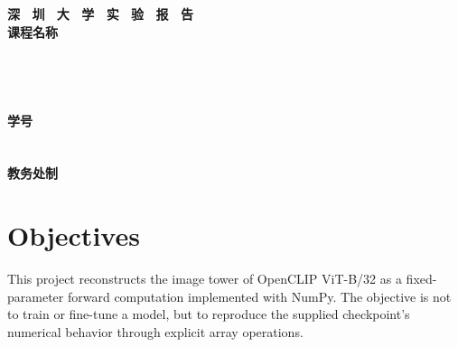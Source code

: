 \documentclass[a4paper,12pt]{article}
\begin{document}
\begin{titlepage}
    \centering
    \vspace*{2cm}
    \Huge{\textbf{深 \ 圳 \ 大 \ 学 \ 实 \ 验 \ 报 \ 告}}\\[1.5cm]

    {\Large\textbf{课程名称}\quad\underline{}}\\[0.5cm]
    {\Large
    \noindent{}
    \underline{}}\\[0.5cm]
    {\Large
    \noindent{}
    \underline{\makebox[8cm][c]{}}}\\[0.5cm]
    {\Large
    \noindent{}
    \underline{\makebox[8cm][c]{}}}\\[0.5cm]
    {\Large
    \noindent{}
    \underline{\makebox[8cm][c]{}}}\\[0.5cm]
    {\Large
    \noindent{}
    \underline{\makebox[3cm][c]{}}
    \hspace{0.5cm}
    \textbf{学号}
    \underline{\makebox[3cm][c]{}}}\\[0.5cm]
    {\Large
    \noindent{}
    \underline{\makebox[8cm][c]{}}}\\[0.5cm]
    {\Large
    \noindent{}
    \underline{\makebox[8cm][c]{}}}\\[1.5cm]

    \vfill
    \Large{\textbf{教务处制}}
\end{titlepage}

\newpage

\section{Objectives}

This project reconstructs the image tower of OpenCLIP ViT-B/32 as a
fixed-parameter forward computation implemented with NumPy. The objective is
not to train or fine-tune a model, but to reproduce the supplied checkpoint's
numerical behavior through explicit array operations.
\end{document}
